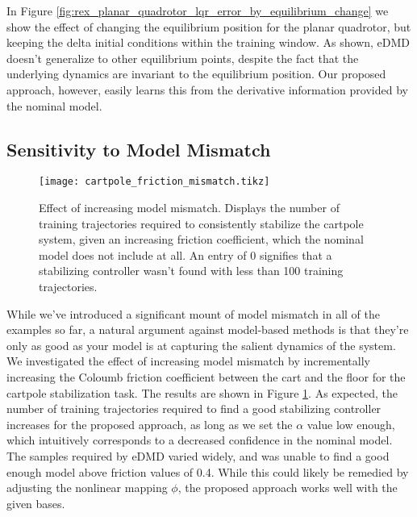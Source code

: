 \documentclass{article}
\begin{document}
In Figure \ref{fig:rex_planar_quadrotor_lqr_error_by_equilibrium_change} we show the effect 
of changing the equilibrium position for the planar quadrotor, but keeping the delta initial
conditions within the training window. As shown, eDMD doesn't generalize to other
equilibrium points, despite the fact that the underlying dynamics are invariant to the
equilibrium position. Our proposed approach, however, easily learns this from the derivative
information provided by the nominal model.

\subsection{Sensitivity to Model Mismatch}
\begin{figure}
  \centering
  \texttt{[image: cartpole\_friction\_mismatch.tikz]}
  \caption{Effect of increasing model mismatch. Displays the number of training trajectories
  required to consistently stabilize the cartpole system, given an increasing friction 
  coefficient, which the nominal model does not include at all. An entry of 0 signifies 
  that a stabilizing controller wasn't found with less than 100 training trajectories.
  }
  \label{fig:cartpole_friction_mismatch}
\end{figure}

While we've introduced a significant mount of model mismatch in all of the examples so far, 
a natural argument against model-based methods is that they're only as good as your model is
at capturing the salient dynamics of the system. We investigated the effect of increasing
model mismatch by incrementally increasing the Coloumb friction coefficient between the cart
and the floor for the cartpole stabilization task. The results are shown in Figure 
\ref{fig:cartpole_friction_mismatch}. As expected, the number of training trajectories 
required to find a good stabilizing controller increases for the proposed approach, as long 
as we set the $\alpha$ value low enough, which intuitively corresponds to a decreased 
confidence in the nominal model. The samples required by eDMD varied widely, and was unable 
to find a good enough model above friction values of 0.4. While this could likely be
remedied by adjusting the nonlinear mapping $\phi$, the proposed approach works well with
the given bases.

      
\end{document}
